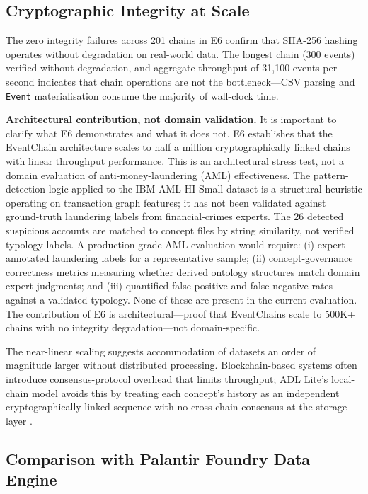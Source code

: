 \subsection{Cryptographic Integrity at Scale}\label{cryptographic-integrity-at-scale}

The zero integrity failures across 201 chains in E6 confirm that SHA-256 hashing operates without degradation on real-world data. The longest chain (300 events) verified without degradation, and aggregate throughput of 31,100 events per second indicates that chain operations are not the bottleneck---CSV parsing and \texttt{Event} materialisation consume the majority of wall-clock time.

\textbf{Architectural contribution, not domain validation.} It is important to clarify what E6 demonstrates and what it does not. E6 establishes that the EventChain architecture scales to half a million cryptographically linked chains with linear throughput performance. This is an architectural stress test, not a domain evaluation of anti-money-laundering (AML) effectiveness. The pattern-detection logic applied to the IBM AML HI-Small dataset is a structural heuristic operating on transaction graph features; it has not been validated against ground-truth laundering labels from financial-crimes experts. The 26 detected suspicious accounts are matched to concept files by string similarity, not verified typology labels. A production-grade AML evaluation would require: (i) expert-annotated laundering labels for a representative sample; (ii) concept-governance correctness metrics measuring whether derived ontology structures match domain expert judgments; and (iii) quantified false-positive and false-negative rates against a validated typology. None of these are present in the current evaluation. The contribution of E6 is architectural---proof that EventChains scale to 500K+ chains with no integrity degradation---not domain-specific.

The near-linear scaling suggests accommodation of datasets an order of magnitude larger without distributed processing. Blockchain-based systems often introduce consensus-protocol overhead that limits throughput; ADL Lite's local-chain model avoids this by treating each concept's history as an independent cryptographically linked sequence with no cross-chain consensus at the storage layer \cite{ref15}.

\subsection{Comparison with Palantir Foundry Data Engine}\label{comparison-with-palantir-foundry-data-engine}

